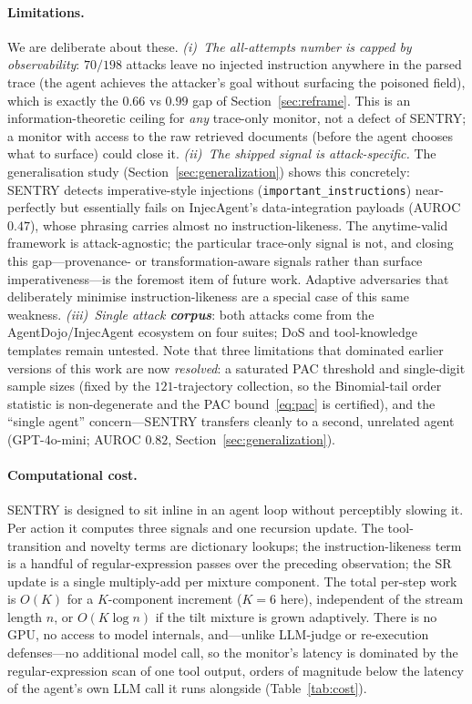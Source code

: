 \documentclass[pdflatex,sn-mathphys-num]{sn-jnl}%
\theoremstyle{thmstyleone}%
\theoremstyle{thmstyletwo}%
\theoremstyle{thmstylethree}%
\begin{document}
\paragraph{Limitations.}\label{sec:limitations} We are deliberate about these.
\emph{(i)~The all-attempts number is capped by observability}: \(70/198\)
attacks leave no injected instruction anywhere in the parsed trace (the agent
achieves the attacker's goal without surfacing the poisoned field), which is
exactly the \(0.66\) vs \(0.99\) gap of Section~\ref{sec:reframe}. This is an
information-theoretic ceiling for \emph{any} trace-only monitor, not a defect
of SENTRY; a monitor with access to the raw retrieved documents (before the
agent chooses what to surface) could close it. \emph{(ii)~The shipped signal is
attack-specific.} The generalisation study (Section~\ref{sec:generalization})
shows this concretely: SENTRY detects imperative-style injections
(\texttt{important\_instructions}) near-perfectly but essentially fails on
InjecAgent's data-integration payloads (AUROC \(0.47\)), whose phrasing carries
almost no instruction-likeness. The anytime-valid framework is attack-agnostic;
the particular trace-only signal is not, and closing this gap---provenance- or
transformation-aware signals rather than surface imperativeness---is the
foremost item of future work. Adaptive adversaries that deliberately minimise
instruction-likeness are a special case of this same weakness.
\emph{(iii)~Single attack \textbf{corpus}}: both attacks come from the
AgentDojo/InjecAgent ecosystem on four suites; DoS and tool-knowledge templates
remain untested. Note that three limitations that dominated earlier versions of
this work are now \emph{resolved}: a saturated PAC threshold and single-digit
sample sizes (fixed by the \(121\)-trajectory collection, so the Binomial-tail
order statistic is non-degenerate and the PAC bound~\eqref{eq:pac} is certified),
and the ``single agent'' concern---SENTRY transfers cleanly to a second,
unrelated agent (GPT-4o-mini; AUROC \(0.82\), Section~\ref{sec:generalization}).

\paragraph{Computational cost.} SENTRY is designed to sit inline in an agent
loop without perceptibly slowing it. Per action it computes three signals and
one recursion update. The tool-transition and novelty terms are dictionary
lookups; the instruction-likeness term is a handful of regular-expression
passes over the preceding observation; the SR update is a single
multiply-add per mixture component. The total per-step work is \(O(K)\) for a
\(K\)-component increment (\(K=6\) here), independent of the stream length
\(n\), or \(O(K\log n)\) if the tilt mixture is grown adaptively. There is no
GPU, no access to model internals, and---unlike LLM-judge or
re-execution defenses---no additional model call, so the monitor's latency is
dominated by the regular-expression scan of one tool output, orders of
magnitude below the latency of the agent's own LLM call it runs alongside
(Table~\ref{tab:cost}).
\end{document}
